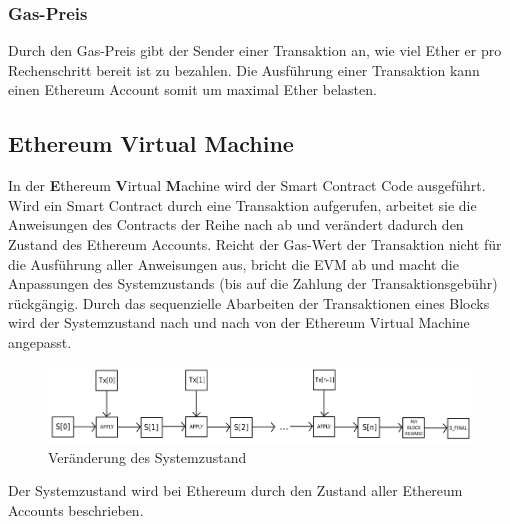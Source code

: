 \subsubsection{Gas-Preis}
Durch den Gas-Preis gibt der Sender einer Transaktion an, wie viel Ether er pro Rechenschritt bereit ist zu bezahlen. Die Ausführung einer Transaktion kann einen Ethereum Account somit um maximal  Ether belasten.

\subsection{Ethereum Virtual Machine}\label{eth_evm} 
In der \textbf{E}thereum \textbf{V}irtual \textbf{M}achine wird der Smart Contract Code ausgeführt. Wird ein Smart Contract durch eine Transaktion aufgerufen, arbeitet sie die Anweisungen des Contracts der Reihe nach ab und verändert dadurch den Zustand des Ethereum Accounts. Reicht der Gas-Wert der Transaktion nicht für die Ausführung aller Anweisungen aus, bricht die EVM ab und macht die Anpassungen des Systemzustands (bis auf die Zahlung der Transaktionsgebühr) rückgängig. Durch das sequenzielle Abarbeiten der Transaktionen eines Blocks wird der Systemzustand nach und nach von der Ethereum Virtual Machine angepasst.
\begin{figure}[H]
\centering
\includegraphics[width=1\linewidth]{Figures/eth/ETH_txn_statetransformation}
\decoRule
\caption{Veränderung des Systemzustand}
\label{fig:ETH_txn_statetransformation}
\end{figure}
Der Systemzustand wird bei Ethereum durch den Zustand aller Ethereum Accounts beschrieben. 

